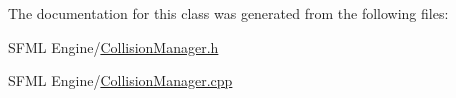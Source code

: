 The documentation for this class was generated from the following files\+:\begin{DoxyCompactItemize}
\item 
S\+F\+M\+L Engine/\hyperlink{_collision_manager_8h}{Collision\+Manager.\+h}\item 
S\+F\+M\+L Engine/\hyperlink{_collision_manager_8cpp}{Collision\+Manager.\+cpp}\end{DoxyCompactItemize}
